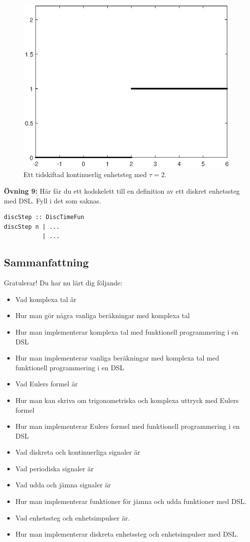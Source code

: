 \documentclass{article}
\begin{document}
\begin{figure}[ht]
\centerline{\includegraphics[scale=0.50]{shiftedHeavy.eps}}
\caption{Ett tidskiftad kontinuerlig enhetsteg med $\tau = 2$.}
\label{}
\end{figure}

\textbf{Övning 9:} Här får du ett kodskelett till en definition av ett diskret enhetssteg med DSL. Fyll i det som saknas.
\begin{verbatim}
discStep :: DiscTimeFun
discStep n | ...
           | ...
\end{verbatim}
\newpage
\subsection{Sammanfattning}
Gratulerar! Du har nu lärt dig följande:
\begin{itemize}
\item Vad komplexa tal är
\item Hur man gör några vanliga beräkningar med komplexa tal
\item Hur man implementerar komplexa tal med funktionell programmering i en DSL
\item Hur man implementerar vanliga beräkningar med komplexa tal med funktionell programmering i en DSL
\item Vad Eulers formel är
\item Hur man kan skriva om trigonometriska och komplexa uttryck med Eulers formel
\item Hur man implementerar Eulers formel med funktionell programmering i en DSL
\item Vad diskreta och kontinuerliga signaler är
\item Vad periodiska signaler är
\item Vad udda och jämna signaler är
\item Hur man implementerar funktioner för jämna och udda funktioner med DSL.
\item Vad enhetssteg och enhetsimpulser är.
\item Hur man implementerar diskreta enhetssteg och enhetsimpulser med DSL.
\end{itemize}
\end{document}
